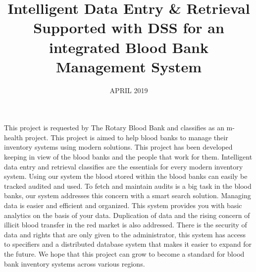\documentclass[BTech]{srmuthesis}
\begin{document}

\title{Intelligent Data Entry \& Retrieval Supported with DSS for an integrated Blood Bank Management System
} %

\firstauthorregno{[Reg No: RA1511008010221]}
\secondauthorregno{[Reg No: RA1511008010237]}
\thirdauthorregno{[Reg No: RA1511008010255]}
\fourthauthorregno{[Reg No: RA1511008010261]}
\fifthauthorregno{[Reg No: RA1511008010295]}
\date{APRIL 2019} %

\maketitle
\certificate





\abstract
\begin{doublespacing}
{\large\noindent This project is requested by The Rotary Blood Bank and classifies as an m-health project. This project is aimed to help blood banks to manage their inventory systems using modern solutions. This project has been developed keeping in view of the blood banks and the people that work for them. Intelligent data entry and retrieval classifies are the essentials for every modern inventory system. Using our system the blood stored within the blood banks can easily be tracked audited and used. To fetch and maintain audits is a big task in the blood banks, our system addresses this concern with a smart search solution. Managing data is easier and efficient and organized. This system provides you with basic analytics on the basis of your data. Duplication of data and the rising concern of illicit blood transfer in the red market is also addressed. There is the security of data and rights that are only given to the administrator, this system has access to specifiers and a distributed database system that makes it easier to expand for the future. We hope that this project can grow to become a standard for blood bank inventory systems across various regions. }
\end{doublespacing}
\end{document}
